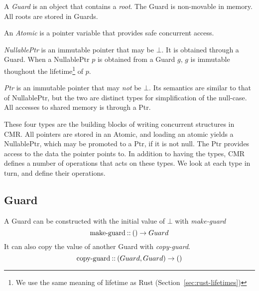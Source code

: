 \begin{definition}
  A \emph{Guard} is an object that contains a \emph{root}. The Guard is non-movable in memory.
  All roots are stored in Guards.
\end{definition}

\begin{definition}[Atomic]
  An \emph{Atomic} is a pointer variable that provides safe concurrent access.
\end{definition}

\begin{definition}[NullablePtr]
  \emph{NullablePtr} is an immutable pointer that may be $\bot$. It is obtained through a Guard.
  When a NullablePtr $p$ is obtained from a Guard $g$, $g$ is immutable thoughout the
  lifetime\footnote{We use the same meaning of lifetime as Rust (Section~\ref{sec:rust-lifetimes})}
  of $p$.
\end{definition}

\begin{definition}[Ptr]
  \emph{Ptr} is an immutable pointer that may \emph{not} be $\bot$. Its semantics are similar to
  that of NullablePtr, but the two are distinct types for simplification of the null-case. All
  accesses to shared memory is through a Ptr.
\end{definition}

These four types are the building blocks of writing concurrent structures in CMR\@. All pointers
are stored in an Atomic, and loading an atomic yields a NullablePtr, which may be promoted to a
Ptr, if it is not null. The Ptr provides access to the data the pointer points to.
In addition to having the types, CMR defines a number of operations that acts on these types.
We look at each type in turn, and define their operations.

\subsection{Guard}
A Guard can be constructed with the initial value of $\bot$ with \emph{make-guard}
\begin{equation}\label{eq:make-guard}
  \text{make-guard\:::\:} () \to Guard
\end{equation}
It can also copy the value of another Guard with \emph{copy-guard}.
\begin{equation}\label{eq:copy-guard}
  \text{copy-guard\:::\:} (Guard, Guard) \to ()
\end{equation}


